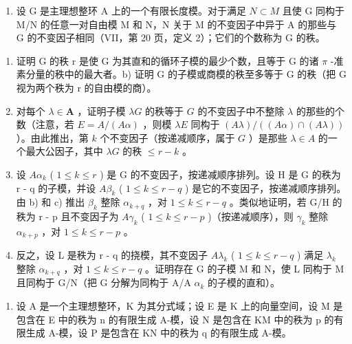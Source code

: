 \begin{enumerate}
\def\labelenumi{\arabic{enumi})}
\setcounter{enumi}{7}
\tightlist
\item
  设 G 是主理想整环 A 上的一个有限长度模。对于满足 \(N \subset M\) 且使 G 同构于 M/N 的任意一对自由模 M 和 N，N 关于 M 的不变因子中异于 A 的那些与 G 的不变因子相同（VII，第 20 页，定义 2）；它们的个数称为 G 的秩。
\end{enumerate}

\begin{enumerate}
\def\labelenumi{\alph{enumi})}
\item
  证明 G 的秩 r 是使 G 为其直和的循环子模的最少个数，且等于 G 的诸 \(\pi\) -准素分量的秩中的最大者。b) 证明 G 的子模或商模的秩至多等于 G 的秩（把 G 视为两个秩为 r 的自由模的商）。
\item
  对每个 \(\lambda \in \mathbf{A}\) ，证明子模 \(\lambda G\) 的秩等于 \(G\) 的不变因子中不整除 \(\lambda\) 的那些的个数（注意，若 \(E = A / (A\alpha)\) ，则模 \(\lambda E\) 同构于 \((A\lambda) / ((A\alpha) \cap (A\lambda))\) ）。由此推出，第 \(k\) 个不变因子（按递减顺序，属于 \(G\) ）是那些 \(\lambda \in A\) 的一个最大公因子，其中 \(\lambda G\) 的秩 \(\leqslant r - k\) 。
\item
  设 \(A\alpha_{k}\) ( \(1 \leqslant k \leqslant r\) ) 是 G 的不变因子，按递减顺序排列。设 H 是 G 的秩为 r - q 的子模，并设 \(A\beta_{k}\) ( \(1 \leqslant k \leqslant r - q\) ) 是它的不变因子，按递减顺序排列。由 b) 和 c) 推出 \(\beta_{k}\) 整除 \(\alpha_{k+q}\) ，对 \(1 \leqslant k \leqslant r - q\) 。类似地证明，若 G/H 的秩为 r - p 且不变因子为 \(A\gamma_{k}\) ( \(1 \leqslant k \leqslant r - p\) )（按递减顺序），则 \(\gamma_{k}\) 整除 \(\alpha_{k+p}\) ，对 \(1 \leqslant k \leqslant r - p\) 。
\item
  反之，设 L 是秩为 r - q 的挠模，其不变因子 \(A\lambda_{k}\) ( \(1 \leqslant k \leqslant r - q\) ) 满足 \(\lambda_{k}\) 整除 \(\alpha_{k+q}\) ，对 \(1 \leqslant k \leqslant r - q\) 。证明存在 G 的子模 M 和 N，使 L 同构于 M 且同构于 G/N（把 G 分解为同构于 A/A \(\alpha_{k}\) 的子模的直和）。
\end{enumerate}

\begin{enumerate}
\def\labelenumi{\arabic{enumi})}
\setcounter{enumi}{8}
\tightlist
\item
  设 A 是一个主理想整环，K 为其分式域；设 E 是 K 上的向量空间，设 M 是包含在 E 中的秩为 n 的有限生成 A-模，设 N 是包含在 KM 中的秩为 p 的有限生成 A-模，设 P 是包含在 KN 中的秩为 q 的有限生成 A-模。
\end{enumerate}

